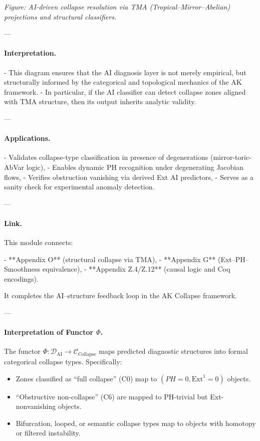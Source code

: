 \documentclass[11pt]{article}
\begin{document}
\begin{axiom}
\begin{axiom}
{{\begin{minipage}{\textwidth}
\small\textit{Figure: AI-driven collapse resolution via TMA (Tropical–Mirror–Abelian) projections and structural classifiers.}
\end{minipage}


---

\paragraph{Interpretation.}

- This diagram ensures that the AI diagnosis layer is not merely empirical, but structurally informed by  
the categorical and topological mechanics of the AK framework.
- In particular, if the AI classifier can detect collapse zones aligned with TMA structure,  
then its output inherits analytic validity.

---

\paragraph{Applications.}

- Validates collapse-type classification in presence of degenerations (mirror-toric-AbVar logic),
- Enables dynamic PH recognition under degenerating Jacobian flows,
- Verifies obstruction vanishing via derived Ext AI predictors,
- Serves as a sanity check for experimental anomaly detection.

---

\paragraph{Link.}  
This module connects:

- **Appendix O** (structural collapse via TMA),
- **Appendix G** (Ext–PH–Smoothness equivalence),
- **Appendix Z.4/Z.12** (causal logic and Coq encodings).

It completes the AI–structure feedback loop in the AK Collapse framework.


---

\paragraph{Interpretation of Functor $\Phi$.}

The functor $\Phi : \mathcal{D}_{\text{AI}} \to \mathcal{C}_{\text{Collapse}}$ maps predicted diagnostic structures  
into formal categorical collapse types. Specifically:

\begin{itemize}
  \item Zones classified as “full collapse” (C0) map to $(PH=0, \mathrm{Ext}^1 = 0)$ objects.
  \item “Obstructive non-collapse” (C6) are mapped to PH-trivial but Ext-nonvanishing objects.
  \item Bifurcation, looped, or semantic collapse types map to objects with homotopy or filtered instability.
\end{itemize}

}}
\end{axiom}
\end{axiom}
\end{document}
